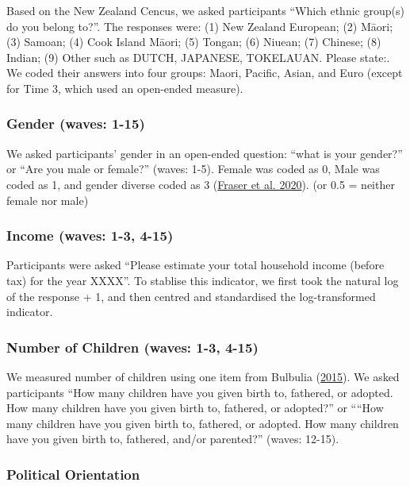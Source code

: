 \documentclass[
  singlecolumn]{report}
\begin{document}
Based on the New Zealand Cencus, we asked participants ``Which ethnic
group(s) do you belong to?''. The responses were: (1) New Zealand
European; (2) Māori; (3) Samoan; (4) Cook Island Māori; (5) Tongan; (6)
Niuean; (7) Chinese; (8) Indian; (9) Other such as DUTCH, JAPANESE,
TOKELAUAN. Please state:. We coded their answers into four groups:
Maori, Pacific, Asian, and Euro (except for Time 3, which used an
open-ended measure).

\hypertarget{gender-waves-1-15}{%
\subsubsection{Gender (waves: 1-15)}\label{gender-waves-1-15}}

We asked participants' gender in an open-ended question: ``what is your
gender?'' or ``Are you male or female?'' (waves: 1-5). Female was coded
as 0, Male was coded as 1, and gender diverse coded as 3
(\protect\hyperlink{ref-fraser_coding_2020}{Fraser et al. 2020}). (or
0.5 = neither female nor male)

\hypertarget{income-waves-1-3-4-15}{%
\subsubsection{Income (waves: 1-3, 4-15)}\label{income-waves-1-3-4-15}}

Participants were asked ``Please estimate your total household income
(before tax) for the year XXXX''. To stablise this indicator, we first
took the natural log of the response + 1, and then centred and
standardised the log-transformed indicator.

\hypertarget{number-of-children-waves-1-3-4-15}{%
\subsubsection{Number of Children (waves: 1-3,
4-15)}\label{number-of-children-waves-1-3-4-15}}

We measured number of children using one item from Bulbulia
(\protect\hyperlink{ref-Bulbulia_2015}{2015}). We asked participants
``How many children have you given birth to, fathered, or adopted. How
many children have you given birth to, fathered, or adopted?'' or
````How many children have you given birth to, fathered, or adopted. How
many children have you given birth to, fathered, and/or parented?''
(waves: 12-15).

\hypertarget{political-orientation}{%
\subsubsection{Political Orientation}\label{political-orientation}}
\end{document}
